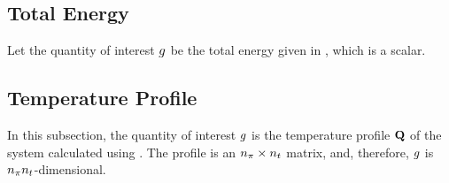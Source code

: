 \subsection{Total Energy}

Let the quantity of interest $g$ be the total energy given in
, which is a scalar.

\subsection{Temperature Profile}

In this subsection, the quantity of interest $g$ is the temperature profile
$\mathbf{Q}$ of the system calculated using . The profile is an
${n_\pi} \times {n_t}$ matrix, and, therefore, $g$ is ${n_\pi} {n_t}$-dimensional.

